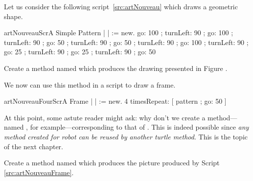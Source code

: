 Let us consider the following script~\ref{src:artNouveau} which draws a geometric shape. 

\begin{scriptfig}{artNouveauScr}{A Simple Pattern}\label{src:artNouveau}
| \caro |
\caro := \Turtle new.
\caro go: 100 ;
        turnLeft: 90 ;
        go: 100 ;
        turnLeft: 90 ;
        go: 50 ;
        turnLeft: 90 ;
        go: 50 ;
        turnLeft: 90 ;
        go: 100 ;
        turnLeft: 90 ;
        go: 25 ;
        turnLeft: 90 ;
        go: 25 ;
        turnLeft: 90 ;
        go: 50
\end{scriptfig}

\begin{exonofig} \label{exo:artNouveau}
Create a method named  which produces the drawing presented in Figure .
\end{exonofig}

We now can use this method in a script to draw a frame.

\begin{scriptfig}{artNouveauFourScr}{A Frame} 
\label{src:artNouveauFrame}
| \caro |
\caro := \Turtle new.
4 timesRepeat: [ \caro pattern ; go: 50 ]
\end{scriptfig}

At this point, some astute reader might ask: why don't we create a
method---named , for example---corresponding to
that of . This is indeed possible
since \emph{any method created for robot can be reused
by another turtle method}. This is the topic of the next chapter. 

\begin{exonofig} \label{exo:artNouveauFrame50}
Create a method named  which produces the picture produced by Script \ref{src:artNouveauFrame}. 
\end{exonofig}





